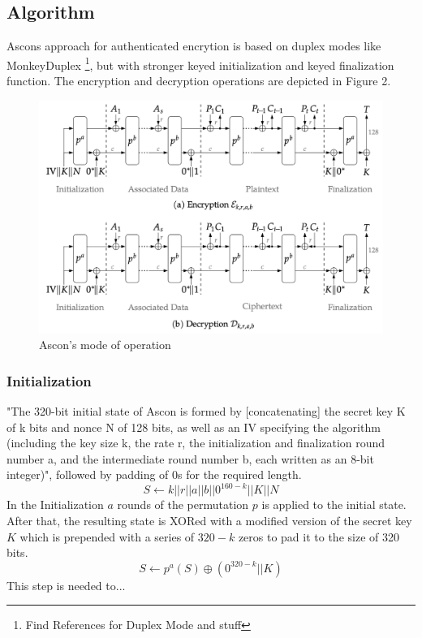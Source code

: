 \subsection{Algorithm} %
Ascons approach for authenticated encrytion is based on duplex modes like MonkeyDuplex \footnote[3]{Find References for Duplex Mode and stuff}, but with stronger keyed initialization and keyed finalization function. The encryption and decryption operations are depicted in Figure 2. \cite{Ascon-v1.2}
\begin{figure}[H]
    \centering
    \includegraphics[width=1\textwidth]{figures/aead-algorithm.png}
    \caption{Ascon's mode of operation \cite{Ascon-v1.2}}
    \label{fig:aead-algorithm}
\end{figure}
\subsubsection{Initialization}
"The 320-bit initial state of Ascon is formed by [concatenating] the secret key K of k bits and nonce N of 128 bits, as well as an IV specifying the algorithm (including the key size k, the rate r, the initialization and finalization round number a, and the intermediate round number b, each written as an 8-bit integer)", followed by padding of 0s for the required length. 
$$S \leftarrow k || r || a || b || 0^{160-k} || K || N $$
In the Initialization $a$ rounds of the permutation $p$ is applied to the initial state. After that, the resulting state is XORed with a modified version of the secret key $K$ which is prepended with a series of $320-k$ zeros to pad it to the size of 320 bits. \cite{Ascon-v1.2}
$$S \leftarrow p^a(S) \oplus (0^{320-k} || K)$$
This step is needed to... 

